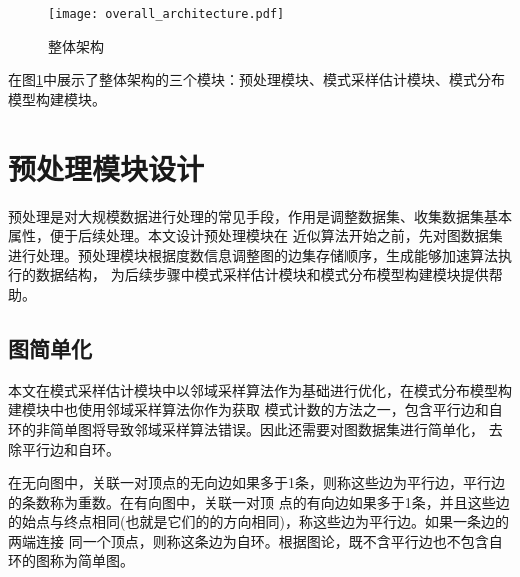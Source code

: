 \documentclass[master]{thesis-uestc}
\begin{document}
\begin{figure}
    \texttt{[image: overall\_architecture.pdf]}
	\caption{整体架构}
	\label{fig:over_architecture}
\end{figure}
    
    在图\ref{fig:over_architecture}中展示了整体架构的三个模块：预处理模块、模式采样估计模块、模式分布模型构建模块。
\section{预处理模块设计}
\label{sec:preprocessing-module}
    预处理是对大规模数据进行处理的常见手段，作用是调整数据集、收集数据集基本属性，便于后续处理。本文设计预处理模块在
近似算法开始之前，先对图数据集进行处理。预处理模块根据度数信息调整图的边集存储顺序，生成能够加速算法执行的数据结构，
为后续步骤中模式采样估计模块和模式分布模型构建模块提供帮助。

\subsection{图简单化}
\label{subsec:simplification}

    本文在模式采样估计模块中以邻域采样算法作为基础进行优化，在模式分布模型构建模块中也使用邻域采样算法你作为获取
模式计数的方法之一，包含平行边和自环的非简单图将导致邻域采样算法错误。因此还需要对图数据集进行简单化，
去除平行边和自环。

    在无向图中，关联一对顶点的无向边如果多于1条，则称这些边为平行边，平行边的条数称为重数。在有向图中，关联一对顶
点的有向边如果多于1条，并且这些边的始点与终点相同(也就是它们的的方向相同)，称这些边为平行边。如果一条边的两端连接
同一个顶点，则称这条边为自环。根据图论，既不含平行边也不包含自环的图称为简单图。
\end{document}
